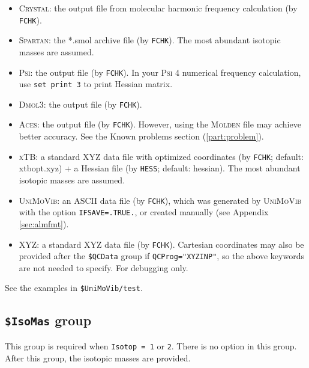 \documentclass[12pt,english]{extarticle}
\begin{document}
\begin{itemize}
\item \textsc{Crystal}: the output file from molecular harmonic frequency calculation (by \verb|FCHK|).
\item \textsc{Spartan}: the *.smol archive file (by \verb|FCHK|). The most abundant isotopic masses are assumed.
\item \textsc{Psi}: the output file (by \verb|FCHK|). In your \textsc{Psi} 4 numerical frequency calculation, use \texttt{set print 3} to print Hessian matrix.
\item \textsc{Dmol3}: the output file (by \verb|FCHK|).
\item \textsc{Aces}: the output file (by \verb|FCHK|). However, using the \textsc{Molden} file may achieve better accuracy. See the Known problems section (\ref{part:problem}).
\item \textsc{xTB}: a standard XYZ data file with optimized coordinates (by \verb|FCHK|; default: xtbopt.xyz) + a Hessian file (by \verb|HESS|; default: hessian). The most abundant isotopic masses are assumed.
\item \textsc{UniMoVib}: an ASCII data file (by \verb|FCHK|), which was generated by \textsc{UniMoVib} with the option \verb|IFSAVE=.TRUE.|, or created manually (see Appendix \ref{sec:almfmt}).
\item XYZ: a standard XYZ data file (by \verb|FCHK|). Cartesian coordinates may also be provided after the \texttt{\$QCData} group if \verb|QCProg="XYZINP"|, so the above keywords are not needed to specify. For debugging only.
\end{itemize}

See the examples in \verb|$UniMoVib/test|.


\subsection{\texttt{\$IsoMas} group} \label{sec:inp-isomas}

This group is required when \verb|Isotop = 1| or \verb|2|. There is no option in
this group. After this group, the isotopic masses are provided.
\end{document}
